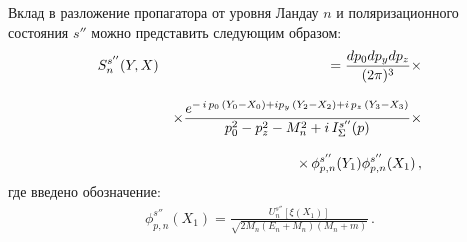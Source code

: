 \documentclass[cp1251%
               ]{jetp} %
\newcommand{\ii}{\mathrm{i}} %
\newcommand{\dd}{\mathrm{d}} %
\newcommand{\eee}{\mathrm{e}} %
\begin{document}
Вклад в разложение пропагатора от уровня Ландау $n$ и поляризационного состояния $s''$ можно представить следующим образом:
%
\begin{eqnarray}
\label{eq:propagator}
S^{s''}_n (Y, X) && =  \int \frac{\dd p_0 \dd p_y \dd p_z}{(2\pi)^3} \times
\\[3mm]
\nonumber
&& \times \frac{\eee^{- \, \ii \,  p_0 \,(Y_0 - X_0) + 
		\ii p_y \,(Y_2 - X_2) +  \ii \,  p_z \,(Y_3 - X_3)}}
{p_0^2 - p_z^2 - M_n^2 + \ii\, {\cal I}^{s''}_\Sigma (p)} \times
\\[3mm]
\nonumber
&& \times
\, \phi^{s''}_{p, n} (Y_1) \bar \phi^{s''}_{p, n} (X_1) \, ,
\end{eqnarray}
%
\noindent где введено обозначение:
%
\begin{eqnarray}
\phi^{s''}_{p, n} (X_1) =   \frac{U^{s''}_{n} [\xi(X_1)]}
{\sqrt{2 M_n (E_{n} + M_n)(M_n + m)}} \, .
\label{eq:phi_psi}
\end{eqnarray}
\end{document}

